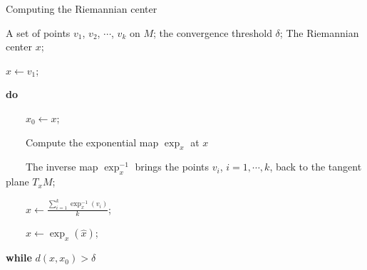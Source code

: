 \begin{algorithm} [t]
\label{alg:construction} \caption{Computing the Riemannian center}
\begin{algorithmic}[1]
\Require A set of points $v_1$, $v_2$, $\cdots$, $v_k$ on $M$; the convergence threshold $\delta$;
\Ensure The Riemannian center $x$;

\State $x\gets v_1$;

\State \textbf{do}

\State ~~~~$x_0\gets x$;

\State ~~~~Compute the exponential map $\exp_{x}$ at $x$

\State ~~~~The inverse map $\exp_{x}^{-1}$ brings the points $v_i$, $i=1,\cdots,k$, back to the tangent plane $T_{x}M$;

\State ~~~~$\hat{x}\gets\frac{\sum_{i=1}^{k}\exp_{x}^{-1}(v_i)}{k}$;

\State ~~~~$x\gets \exp_{x}(\hat{x})$;

\State \textbf{while} $d(x,x_0)>\delta$
\end{algorithmic}
\end{algorithm}

